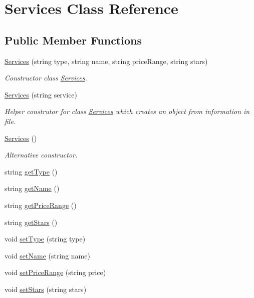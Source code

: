 \hypertarget{class_services}{}\section{Services Class Reference}
\label{class_services}
\subsection*{Public Member Functions}
\begin{DoxyCompactItemize}
\item 
\hyperlink{class_services_ae5a9f9602657bb68fdd380fed0f7a237}{Services} (string type, string name, string price\+Range, string stars)
\begin{DoxyCompactList}\small\item\em Constructor class \hyperlink{class_services}{Services}. \end{DoxyCompactList}\item 
\hyperlink{class_services_a57ccd705c80a34f7c7cd3c35057c6256}{Services} (string service)
\begin{DoxyCompactList}\small\item\em Helper construtor for class \hyperlink{class_services}{Services} which creates an object from information in file. \end{DoxyCompactList}\item 
\mbox{\label{class_services_ac158976e8d9bd44be7e5959452b13178}} 
\hyperlink{class_services_ac158976e8d9bd44be7e5959452b13178}{Services} ()
\begin{DoxyCompactList}\small\item\em Alternative constructor. \end{DoxyCompactList}\item 
string \hyperlink{class_services_af4da1cfed2bfabfc164d505993d105ce}{get\+Type} ()
\item 
string \hyperlink{class_services_a71c420517519b0316b771c637044b76a}{get\+Name} ()
\item 
string \hyperlink{class_services_ac4c520cb327c737a775be426ffae1165}{get\+Price\+Range} ()
\item 
string \hyperlink{class_services_a35360c22f682d48fd7271f9c5017c7a5}{get\+Stars} ()
\item 
void \hyperlink{class_services_ad299f8ec3b29a5fffc513ae9b89e4c1d}{set\+Type} (string type)
\item 
void \hyperlink{class_services_a68e4ebe3d329da8ffd56cea463fb1c80}{set\+Name} (string name)
\item 
void \hyperlink{class_services_a883f71c238f82e77c01f244ded84dd57}{set\+Price\+Range} (string price)
\item 
void \hyperlink{class_services_a4cc0854b2f6bbb357f4e14d4ed753d2d}{set\+Stars} (string stars)
\end{DoxyCompactItemize}


